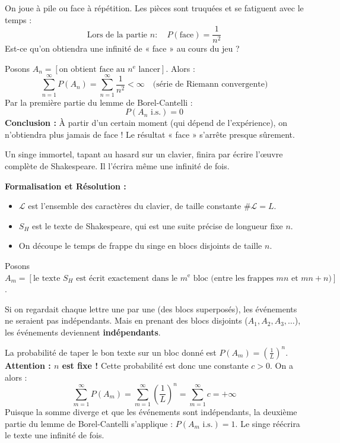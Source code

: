 \begin{exemple}
    On joue à pile ou face à répétition. Les pièces sont truquées et se fatiguent avec le temps :
    \[
    \text{Lors de la partie } n : \quad P(\text{face}) = \frac{1}{n^2}
    \]
    Est-ce qu'on obtiendra une infinité de « face » au cours du jeu ?
    
    Posons $A_n = [\text{on obtient face au } n^\text{e} \text{ lancer}]$. Alors :
    \[
    \sum_{n=1}^{\infty} P(A_n) = \sum_{n=1}^{\infty} \frac{1}{n^2} < \infty \quad \text{(série de Riemann convergente)}
    \]
    Par la première partie du lemme de Borel-Cantelli :
    \[
    P(A_n \text{ i.s.}) = 0
    \]
    \textbf{Conclusion :} À partir d'un certain moment (qui dépend de l'expérience), on n'obtiendra plus jamais de face ! Le résultat « face » s'arrête presque sûrement.
\end{exemple}

\begin{exemple}
    \og Un singe immortel, tapant au hasard sur un clavier, finira par écrire l'œuvre complète de Shakespeare. Il l'écrira même une infinité de fois. \fg{}
    
    \medskip
    \noindent \textbf{Formalisation et Résolution :}
    \begin{itemize}
        \item $\mathcal{L}$ est l'ensemble des caractères du clavier, de taille constante $\#\mathcal{L} = L$.
        \item $S_H$ est le texte de Shakespeare, qui est une suite précise de longueur fixe $n$.
        \item On découpe le temps de frappe du singe en blocs disjoints de taille $n$.
    \end{itemize}
    Posons $A_m = [\text{le texte } S_H \text{ est écrit exactement dans le } m^\text{e} \text{ bloc (entre les frappes } mn \text{ et } mn+n)]$. 
    
    Si on regardait chaque lettre une par une (des blocs superposés), les événements ne seraient pas indépendants. Mais en prenant des blocs disjoints ($A_1, A_2, A_3, \dots$), les événements deviennent \textbf{indépendants}.
    
    La probabilité de taper le bon texte sur un bloc donné est $P(A_m) = \left(\frac{1}{L}\right)^n$. \textbf{Attention : $n$ est fixe !} Cette probabilité est donc une constante $c > 0$. On a alors :
    \[
    \sum_{m=1}^{\infty} P(A_m) = \sum_{m=1}^{\infty} \left(\frac{1}{L}\right)^n = \sum_{m=1}^{\infty} c = +\infty
    \]
    Puisque la somme diverge et que les événements sont indépendants, la deuxième partie du lemme de Borel-Cantelli s'applique : $P(A_m \text{ i.s.}) = 1$. Le singe réécrira le texte une infinité de fois.
\end{exemple}

